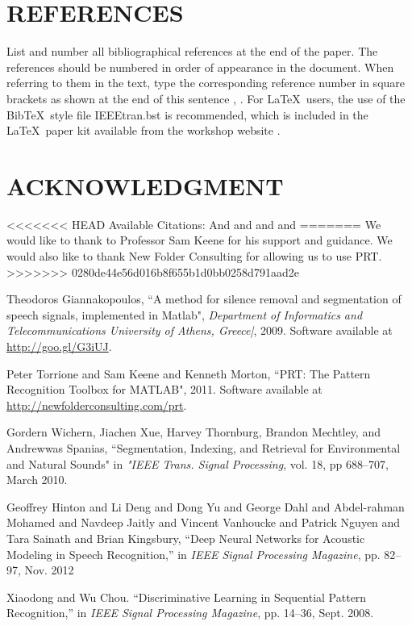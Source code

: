 \documentclass{article}
\begin{document}
\begin{sloppy}
\section{REFERENCES}
\label{sec:ref}

List and number all bibliographical references at the end 
of the paper. The references should be numbered in order 
of appearance in the document. When referring to them in 
the text, type the corresponding reference number in 
square brackets as shown at the end of this sentence 
\cite{cJones2003}, \cite{aSmith2000}. For \LaTeX\ users, 
the use of the Bib\TeX\ style file IEEEtran.bst is 
recommended, which is included in the \LaTeX\ paper 
kit available from the workshop website \cite{aaspweb}.

\section{ACKNOWLEDGMENT}
\label{sec:ack}

<<<<<<< HEAD
Available Citations:
\cite{segmentFeature}  And \cite{silenceRemove} and \cite{prt2011} and \cite{discrimPRT} and \cite{dnn}
=======
We would like to thank to Professor Sam Keene for his support and guidance. 
We would also like to thank New Folder Consulting for allowing us to use PRT.
>>>>>>> 0280de44e56d016b8f655b1d0bb0258d791aad2e

%
%

 \begin{thebibliography}{5}
	Theodoros Giannakopoulos, ``A method for silence removal and segmentation of speech signals, implemented in Matlab",\emph{ Department of Informatics and Telecommunications University of Athens, Greece|}, 2009. Software available at \url{http://goo.gl/G3iUJ}.

 Peter Torrione and Sam Keene and Kenneth Morton, ``{PRT}: The Pattern Recognition Toolbox for {MATLAB}", 2011. Software available at \url{http://newfolderconsulting.com/prt}.

 	Gordern Wichern, Jiachen Xue, Harvey Thornburg, Brandon Mechtley, and Andrewwas Spanias, ``Segmentation, Indexing, and Retrieval for Environmental and Natural Sounds" in \emph{"IEEE Trans. Signal Processing}, vol. 18, pp 688--707, March 2010.

Geoffrey Hinton and Li Deng and Dong Yu and George Dahl and Abdel-rahman Mohamed and Navdeep Jaitly and Vincent Vanhoucke and Patrick Nguyen and Tara Sainath and Brian Kingsbury,  ``Deep Neural Networks for Acoustic Modeling in Speech Recognition,'' in \emph{IEEE Signal Processing Magazine}, pp. 82--97, Nov. 2012
 
Xiaodong and Wu Chou. ``Discriminative Learning in Sequential Pattern Recognition,''  in \emph{IEEE Signal Processing Magazine}, pp. 14--36, Sept. 2008.
 
 \end{thebibliography}


\end{sloppy}
\end{document}
